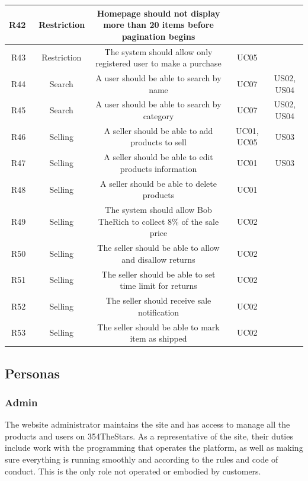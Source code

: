 \documentclass[11pt]{article}
\newcounter{use case ID}
\begin{document}
\begin{table}[H]
\begin{adjustbox}{width=\columnwidth,center}
\begin{tabular}{|r | c| c | c| c|}
                R42 & \ Restriction & Homepage should not display more than 20 items before pagination begins & &  \\
                \hline
                R43 & \ Restriction & The system should allow only \index{registered user}registered user to make a purchase & UC05 &  \\
                \hline
                R44 & \ Search & A user should be able to search by name & UC07 & US02, US04 \\
                \hline
                R45 & \ Search & A user should be able to search by category & UC07 & US02, US04 \\
                \hline
                R46 & \ Selling & A \index{seller}seller should be able to add products to sell & UC01, UC05 & US03 \\
                \hline
                R47 & \ Selling & A seller should be able to edit products \index{information}information & UC01 & US03 \\
                \hline
                R48 & \ Selling & A seller should be able to delete \index{product}products & UC01 &  \\
                \hline
                R49 & \ Selling & The system should allow Bob TheRich to collect 8\% of the sale price & UC02 &  \\
                \hline
                R50 & \ Selling & The seller should be able to allow and disallow returns & UC02 &  \\
                \hline
                R51 & \ Selling & The seller should be able to set time limit for returns & UC02 &  \\
                \hline
                R52 & \ Selling & The seller should receive sale notification & UC02 &  \\
                \hline
                R53 & \ Selling & The seller should be able to mark item as shipped & UC02 &  \\
                \hline
        \end{tabular}
    \end{adjustbox}
\end{table}
\clearpage


\subsection{Personas} \label{actors}
\subsubsection{Admin}
The website administrator maintains the site and has access to manage all the
products and users on 354TheStars. As a representative of the site, their duties include
work with the programming that operates the platform, as well as making sure
everything is running smoothly and according to the rules and code of conduct.
This is the only role not operated or embodied by customers.
\end{document}
